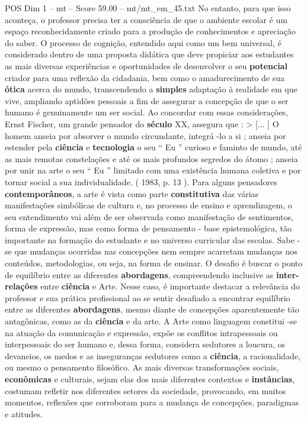 \begin{textsample}{POS Dim 1 – mt – Score 59.00 – mt/mt\_em\_45.txt}
No entanto, para que isso aconteça, o professor precisa ter a consciência de que o ambiente escolar é um espaço reconhecidamente criado para a produção de conhecimentos e apreciação do saber.
O processo de cognição, entendido aqui como um bem universal, é considerado dentro de uma proposta didática que deve propiciar aos estudantes as mais diversas experiências e oportunidades de desenvolver o seu \textbf{potencial} criador para uma reflexão da cidadania, bem como o amadurecimento de sua \textbf{ótica} acerca do mundo, transcendendo a \textbf{simples} adaptação à realidade em que vive, ampliando aptidões pessoais a fim de assegurar a concepção de que o ser humano é genuinamente um ser social.
Ao concordar com essas considerações, Ernst Fischer, um grande pensador do \textbf{século} XX, assegura que : > [... ] O homem anseia por absorver o mundo circundante, integrá -lo a si ; anseia por estender pela \textbf{ciência} e \textbf{tecnologia} o seu “ Eu ” curioso e faminto de mundo, até as mais remotas constelações e até os mais profundos segredos do átomo ; anseia por unir na arte o seu “ Eu ” limitado com uma existência humana coletiva e por tornar social a sua individualidade. ( 1983, p. 13 ).
Para alguns pensadores \textbf{contemporâneos}, a arte é vista como parte \textbf{constitutiva} das várias manifestações simbólicas de cultura e, no processo de ensino e aprendizagem, o seu entendimento vai além de ser observada como manifestação de sentimentos, forma de expressão, mas como forma de pensamento - base epistemológica, tão importante na formação do estudante e no universo curricular das escolas.
Sabe -se que mudanças ocorridas nas concepções nem sempre acarretam mudanças nos conteúdos, metodologias, ou seja, na forma de ensinar.
O desafio é buscar o ponto de equilíbrio entre as diferentes \textbf{abordagens}, compreendendo inclusive as \textbf{inter-relações} entre \textbf{ciência} e Arte.
Nesse caso, é importante destacar a relevância do professor e sua prática profissional ao se sentir desafiado a encontrar equilíbrio entre as diferentes \textbf{abordagens}, mesmo diante de concepções aparentemente tão antagônicas, como as da \textbf{ciência} e da arte.
A Arte como linguagem constitui -se na atuação da comunicação e expressão, expõe os conflitos intrapessoais ou interpessoais do ser humano e, dessa forma, considera sedutores a loucura, os devaneios, os medos e as inseguranças sedutores como a \textbf{ciência}, a racionalidade, ou mesmo o pensamento filosófico.
As mais diversas transformações sociais, \textbf{econômicas} e culturais, sejam elas dos mais diferentes contextos e \textbf{instâncias}, costumam refletir nos diferentes setores da sociedade, provocando, em muitos momentos, reflexões que corroboram para a mudança de concepções, paradigmas e atitudes.

\end{textsample}

